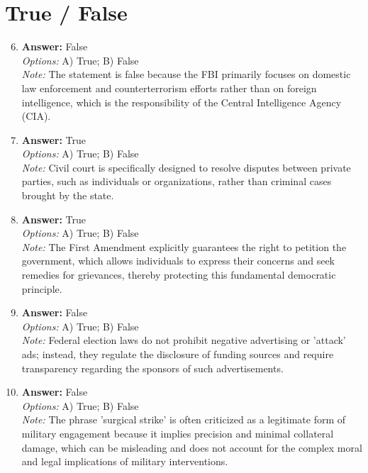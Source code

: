 \documentclass[12pt]{article}
\begin{document}
\section*{True / False}
\begin{enumerate}[label=\arabic*.]
\setcounter{enumi}{5}
\item \textbf{Answer:} False
\\ \textit{Options:} A) True; B) False
\\ \textit{Note:} The statement is false because the FBI primarily focuses on domestic law enforcement and counterterrorism efforts rather than on foreign intelligence, which is the responsibility of the Central Intelligence Agency (CIA).
\item \textbf{Answer:} True
\\ \textit{Options:} A) True; B) False
\\ \textit{Note:} Civil court is specifically designed to resolve disputes between private parties, such as individuals or organizations, rather than criminal cases brought by the state.
\item \textbf{Answer:} True
\\ \textit{Options:} A) True; B) False
\\ \textit{Note:} The First Amendment explicitly guarantees the right to petition the government, which allows individuals to express their concerns and seek remedies for grievances, thereby protecting this fundamental democratic principle.
\item \textbf{Answer:} False
\\ \textit{Options:} A) True; B) False
\\ \textit{Note:} Federal election laws do not prohibit negative advertising or 'attack' ads; instead, they regulate the disclosure of funding sources and require transparency regarding the sponsors of such advertisements.
\item \textbf{Answer:} False
\\ \textit{Options:} A) True; B) False
\\ \textit{Note:} The phrase 'surgical strike' is often criticized as a legitimate form of military engagement because it implies precision and minimal collateral damage, which can be misleading and does not account for the complex moral and legal implications of military interventions.
\end{enumerate}
\end{document}
